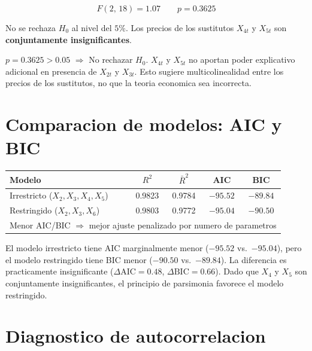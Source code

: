 \documentclass[12pt, letterpaper]{article}
\begin{document}
\begin{equation}
  F(2,\,18) = 1.07 \qquad p = 0.3625
\end{equation}

No se rechaza $H_0$ al nivel del $5\%$. Los precios de los sustitutos
$X_{4t}$ y $X_{5t}$ son \textbf{conjuntamente insignificantes}.

\begin{clave}
  $p = 0.3625 > 0.05$ $\Rightarrow$ No rechazar $H_0$.
  $X_{4t}$ y $X_{5t}$ no aportan poder explicativo adicional en presencia
  de $X_{2t}$ y $X_{3t}$. Esto sugiere multicolinealidad entre los precios
  de los sustitutos, no que la teoria economica sea incorrecta.
\end{clave}

\section{Comparacion de modelos: AIC y BIC}

\begin{center}
\renewcommand{\arraystretch}{1.3}
\small
\begin{tabular}{lcccc}
\toprule
\textbf{Modelo} & $R^2$ & $\bar{R}^2$ & \textbf{AIC} & \textbf{BIC} \\
\midrule
Irrestricto ($X_2, X_3, X_4, X_5$) & 0.9823 & 0.9784 & $-95.52$ & $-89.84$ \\
Restringido ($X_2, X_3, X_6$)       & 0.9803 & 0.9772 & $-95.04$ & $-90.50$ \\
\midrule
\multicolumn{5}{l}{Menor AIC/BIC $\Rightarrow$ mejor ajuste penalizado por numero de parametros} \\
\bottomrule
\end{tabular}
\end{center}

El modelo irrestricto tiene AIC marginalmente menor ($-95.52$ vs.\ $-95.04$),
pero el modelo restringido tiene BIC menor ($-90.50$ vs.\ $-89.84$). La
diferencia es practicamente insignificante ($\Delta\text{AIC} = 0.48$,
$\Delta\text{BIC} = 0.66$). Dado que $X_4$ y $X_5$ son conjuntamente
insignificantes, el principio de parsimonia favorece el modelo restringido.

\section{Diagnostico de autocorrelacion}
\end{document}

